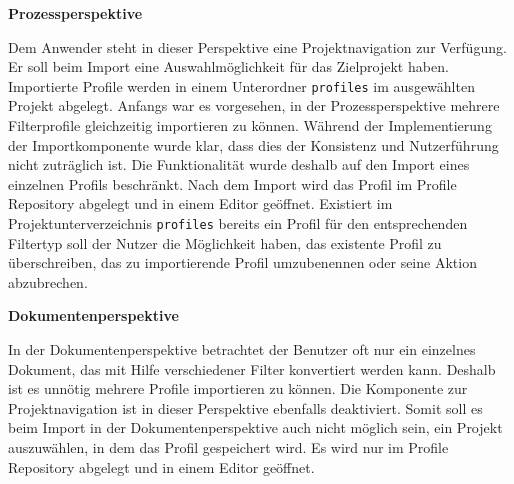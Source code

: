{{{\textbf{Prozessperspektive}
 {
 
Dem Anwender steht in dieser Perspektive eine Projektnavigation zur Verfügung. Er soll beim Import eine Auswahlmöglichkeit für das Zielprojekt haben. Importierte Profile werden in einem Unterordner \texttt{profiles} im ausgewählten Projekt abgelegt. Anfangs war es vorgesehen, in der Prozessperspektive mehrere Filterprofile gleichzeitig importieren zu können. Während der Implementierung der Importkomponente wurde klar, dass dies der Konsistenz und Nutzerführung nicht zuträglich ist. Die Funktionalität wurde deshalb auf den Import eines einzelnen Profils beschränkt. Nach dem Import wird das Profil im Profile Repository abgelegt und in einem Editor geöffnet. Existiert im Projektunterverzeichnis \texttt{profiles} bereits ein Profil für den entsprechenden Filtertyp soll der Nutzer die Möglichkeit haben, das existente Profil zu überschreiben, das zu importierende Profil umzubenennen oder seine Aktion abzubrechen. 

}


\textbf{Dokumentenperspektive} 
{

In der Dokumentenperspektive betrachtet der Benutzer oft nur ein einzelnes Dokument, das mit Hilfe verschiedener Filter konvertiert werden kann. Deshalb ist es unnötig mehrere Profile importieren zu können. Die Komponente zur Projektnavigation ist in dieser Perspektive ebenfalls deaktiviert. Somit soll es beim Import in der Dokumentenperspektive auch nicht möglich sein, ein Projekt auszuwählen, in dem das Profil gespeichert wird. Es wird nur im Profile Repository abgelegt und in einem Editor geöffnet.

}



}

}}
